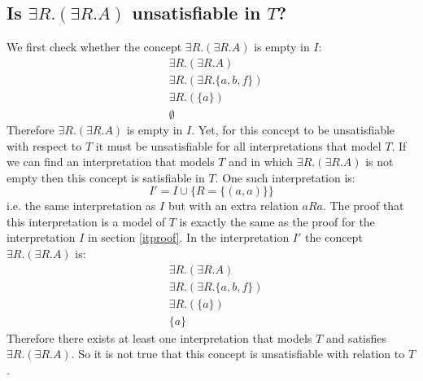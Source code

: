 \documentclass[a4paper,12pt]{article}
\begin{document}
\subsection[Satisfiability]{Is $\exists R.(\exists R.A)$ unsatisfiable in $T$?}
We first check whether the concept $ \exists R.(\exists R.A) $ is empty in $I$:
\begin{align*}
&\exists R.(\exists R.A)\\
&\exists R.(\exists R.\{a,b,f\})\\
&\exists R.(\{a\})\\
&\emptyset
\end{align*}
Therefore $ \exists R.(\exists R.A) $ is empty in $I$.  Yet, for this concept
to be unsatisfiable with respect to $T$ it must be unsatisfiable for all
interpretations that model $T$.  If we can find an interpretation that models
$T$ and in which $ \exists R.(\exists R.A) $ is not empty then this concept is
satisfiable in $T$.  One such interpretation is:
\begin{equation*}
I' = I \cup \{ R = \{(a,a)\} \}
\end{equation*}
i.e. the same interpretation as $I$ but with an extra relation $aRa$.  The
proof that this interpretation is a model of $T$ is exactly the same as the
proof for the interpretation $I$ in section \ref{itproof}.  In the
interpretation $I'$ the concept $ \exists R.(\exists R.A) $ is:
\begin{align*}
&\exists R.(\exists R.A)\\
&\exists R.(\exists R.\{a,b,f\})\\
&\exists R.(\{a\})\\
&\{a\}
\end{align*}
Therefore there exists at least one interpretation that models $T$ and
satisfies $ \exists R.(\exists R.A) $.  So it is not true that this concept is
unsatisfiable with relation to $T$.
\end{document}

